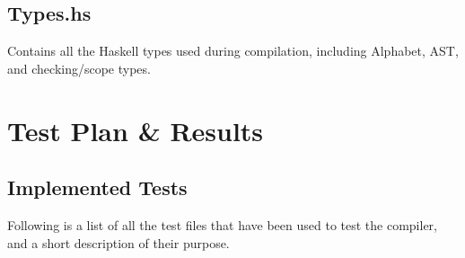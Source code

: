 \documentclass[twoside]{report}
\begin{document}
\section{Types.hs}
Contains all the Haskell types used during compilation, including Alphabet, AST, and checking/scope types.



\chapter{Test Plan \& Results}
\label{test_plan_and_results}


\section{Implemented Tests}
\label{implemented_tests}
Following is a list of all the test files that have been used to test the compiler, and a short description of their purpose.
\end{document}

